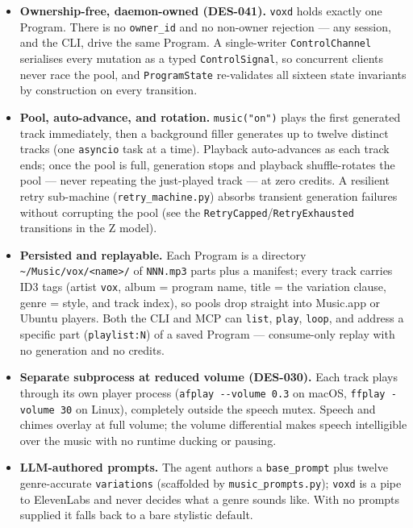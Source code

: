 \documentclass[a4paper,10pt]{article}
\newcommand{\field}[1]{\texttt{#1}}
\begin{document}
\begin{itemize}
  \item \textbf{Ownership-free, daemon-owned (DES-041).} \texttt{voxd}
    holds exactly one Program.  There is no \field{owner\_id} and no
    non-owner rejection --- any session, and the CLI, drive the same
    Program.  A single-writer \texttt{ControlChannel} serialises every
    mutation as a typed \texttt{ControlSignal}, so concurrent clients
    never race the pool, and \texttt{ProgramState} re-validates all
    sixteen state invariants by construction on every transition.
  \item \textbf{Pool, auto-advance, and rotation.} \texttt{music("on")}
    plays the first generated track immediately, then a background filler
    generates up to twelve distinct tracks (one \texttt{asyncio} task at a
    time).  Playback auto-advances as each track ends; once the pool is
    full, generation stops and playback shuffle-rotates the pool ---
    never repeating the just-played track --- at zero credits.  A
    resilient retry sub-machine (\texttt{retry\_machine.py}) absorbs
    transient generation failures without corrupting the pool
    (see the \texttt{RetryCapped}/\texttt{RetryExhausted} transitions in
    the Z model).
  \item \textbf{Persisted and replayable.} Each Program is a directory
    \texttt{\~{}/Music/vox/<name>/} of \texttt{NNN.mp3} parts plus a
    manifest; every track carries ID3 tags (artist \texttt{vox}, album =
    program name, title = the variation clause, genre = style, and track
    index), so pools drop straight into Music.app or Ubuntu players.
    Both the CLI and MCP can \texttt{list}, \texttt{play}, \texttt{loop},
    and address a specific part (\texttt{playlist:N}) of a saved
    Program --- consume-only replay with no generation and no credits.
  \item \textbf{Separate subprocess at reduced volume (DES-030).} Each
    track plays through its own player process (\texttt{afplay
    -{}-volume 0.3} on macOS, \texttt{ffplay -volume 30} on Linux),
    completely outside the speech mutex.  Speech and chimes overlay at
    full volume; the volume differential makes speech intelligible over
    the music with no runtime ducking or pausing.
  \item \textbf{LLM-authored prompts.} The agent authors a
    \field{base\_prompt} plus twelve genre-accurate \field{variations}
    (scaffolded by \texttt{music\_prompts.py}); \texttt{voxd} is a pipe to
    ElevenLabs and never decides what a genre sounds like.  With no
    prompts supplied it falls back to a bare stylistic default.
\end{itemize}
\end{document}
